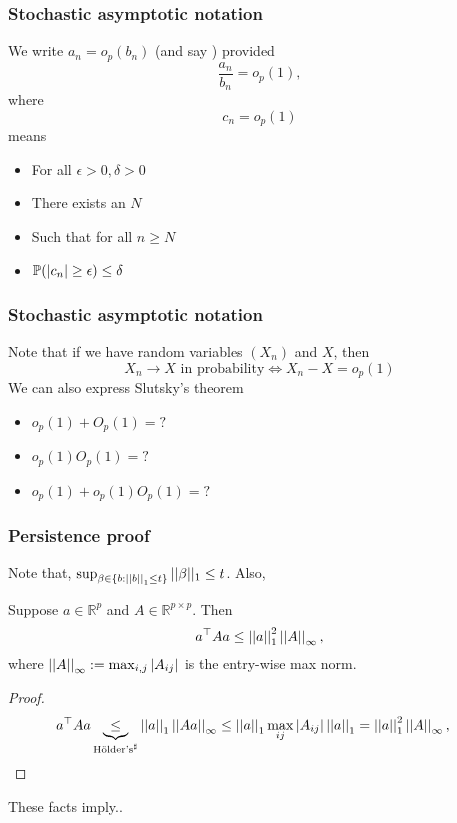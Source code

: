 \documentclass[12pt]{beamer}
\begin{document}
\begin{frame}
  \frametitle{Stochastic asymptotic notation}
We write $a_n = o_p(b_n)$ (and say ) provided
\[
\frac{a_n}{b_n} = o_p(1),
\]
where 
\[
c_n = o_p(1) 
\]
means 
\begin{itemize}
\item For all $\epsilon>0,\delta > 0$
\item There exists an $N$
\item Such that for all $n \geq N$
\item $\P(|c_n| \geq \epsilon) \leq \delta$
\end{itemize}
\end{frame}

\begin{frame}
  \frametitle{Stochastic asymptotic notation}
Note that if we have random variables $(X_n)$ and $X$, then
\[
X_n \rightarrow X \textrm{ in probability} \Leftrightarrow X_n - X = o_p(1)
\]
We can also express Slutsky's theorem\Note
\begin{itemize}
\item $o_p(1) + O_p(1) = ?$
\item $o_p(1) O_p(1) = ?$
\item $o_p(1) + o_p(1)O_p(1) = ?$
\end{itemize}
\end{frame}

\begin{frame}
  \frametitle{Persistence proof}
  Note that, $\sup_{\beta \in \{b: \norm{b}_1 \leq t\}} ||\beta||_1 \leq t$.   Also, 
  \vsp
  
  \begin{lemma}
  \label{lem:quad-form} 
  Suppose $a \in \mathbb{R}^p$ and $A \in
  \mathbb{R}^{p \times p}$.  Then
  \begin{equation*} 
    a^\top A a 
    \leq \norm{a}^2_{1}
    \norm{A}_{\infty},
  \end{equation*}
  where $\norm{A}_\infty:=\max_{i,j} |A_{ij}|$ is the entry-wise max norm.
\end{lemma}
 \begin{proof} 
   \begin{align*}
     a^\top A a & \underbrace{\leq}_{\textrm{H{\"o}lder's\Note}} \norm{a}_{1} \norm {A a}_{\infty} 
      \leq \norm{a}_{1} \max_{ij} |A_{ij}| \norm{a}_1  
      = \norm{a}^2_{1} \norm{A}_{\infty},
   \end{align*}
 \end{proof}
These facts imply..
  \end{frame}
  
\end{document}
